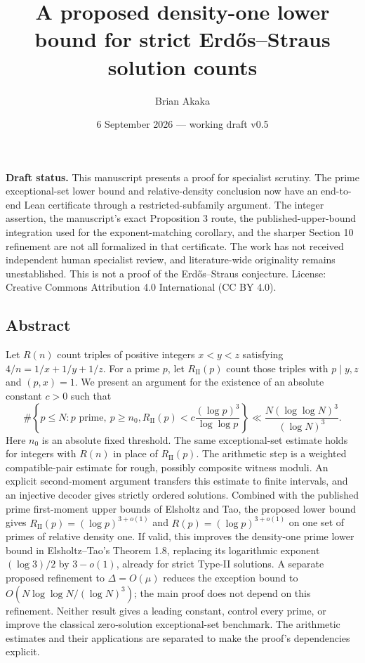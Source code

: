 \documentclass[
  english,
  11pt,
]{article}
\title{A proposed density-one lower bound for strict Erdős--Straus
solution counts}
\author{Brian Akaka}
\date{6 September 2026 --- working draft v0.5}
\begin{document}
\maketitle

\textbf{Draft status.} This manuscript presents a proof for specialist
scrutiny. The prime exceptional-set lower bound and relative-density
conclusion now have an end-to-end Lean certificate through a
restricted-subfamily argument. The integer assertion, the manuscript's
exact Proposition 3 route, the published-upper-bound integration used
for the exponent-matching corollary, and the sharper Section 10
refinement are not all formalized in that certificate. The work has not
received independent human specialist review, and literature-wide
originality remains unestablished. This is not a proof of the
Erdős--Straus conjecture. License: Creative Commons Attribution 4.0
International (CC BY 4.0).

\subsection{Abstract}\label{abstract}

Let \(R(n)\) count triples of positive integers \(x<y<z\) satisfying
\(4/n=1/x+1/y+1/z\). For a prime \(p\), let \(R_{\mathrm{II}}(p)\) count
those triples with \(p\mid y,z\) and \((p,x)=1\). We present an argument
for the existence of an absolute constant \(c>0\) such that \[
\#\left\{p\le N:p\text{ prime},\ p\ge n_0,
 R_{\mathrm{II}}(p)<c\frac{(\log p)^3}{\log\log p}\right\}
\ll \frac{N(\log\log N)^3}{(\log N)^3}.
\] Here \(n_0\) is an absolute fixed threshold. The same exceptional-set
estimate holds for integers with \(R(n)\) in place of
\(R_{\mathrm{II}}(p)\). The arithmetic step is a weighted
compatible-pair estimate for rough, possibly composite witness moduli.
An explicit second-moment argument transfers this estimate to finite
intervals, and an injective decoder gives strictly ordered solutions.
Combined with the published prime first-moment upper bounds of Elsholtz
and Tao, the proposed lower bound gives
\(R_{\mathrm{II}}(p)=(\log p)^{3+o(1)}\) and \(R(p)=(\log p)^{3+o(1)}\)
on one set of primes of relative density one. If valid, this improves
the density-one prime lower bound in Elsholtz--Tao's Theorem 1.8,
replacing its logarithmic exponent \((\log 3)/2\) by \(3-o(1)\), already
for strict Type-II solutions. A separate proposed refinement to
\(\Delta=O(\mu)\) reduces the exception bound to
\(O(N\log\log N/(\log N)^3)\); the main proof does not depend on this
refinement. Neither result gives a leading constant, control every
prime, or improve the classical zero-solution exceptional-set benchmark.
The arithmetic estimates and their applications are separated to make
the proof's dependencies explicit.
\end{document}
